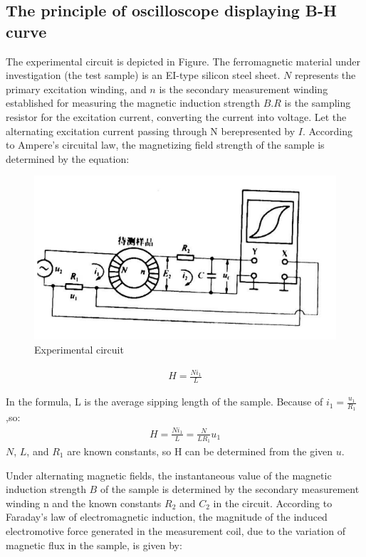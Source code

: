 \documentclass[UTF8]{article}
\begin{document}
    \subsection{The principle of oscilloscope displaying B-H curve}
    The experimental circuit is depicted in Figure. The ferromagnetic material under investigation (the test sample) is an EI-type silicon steel sheet. $N$ represents the primary excitation winding, and $n$ is the secondary measurement winding established for measuring the magnetic induction strength $B. R$ is the sampling resistor for the excitation current, converting the current into voltage. Let the alternating excitation current passing through N berepresented by $I$. According to Ampere's circuital law, the magnetizing field strength of the sample is determined by the equation:
       \begin{figure}[H]
       	    	\centering
       	    	\includegraphics[clip,scale=0.9,trim={0 0 0 0}]{fig/fig7.png}
       	        \caption{Experimental circuit}
       	        \label{figure.1}
           \end{figure}  
    
    \begin{eqnarray}
    H = \frac{Ni_1}{L}
    \end{eqnarray}
    
    In the formula, L is the average sipping length of the sample. Because of $i_1 = \frac{u_1}{R_1}$,so:
    \begin{eqnarray}
    H = \frac{Ni_1}{L} = \frac{N}{LR_1}u_1
    \end{eqnarray}
    $N$, $L$, and $R_1$ are known constants, so H can be determined from the given $u$.
    
    Under alternating magnetic fields, the instantaneous value of the magnetic induction strength $B$ of the sample is determined by the secondary measurement winding n and the known constants $R_2$ and $C_2$ in the circuit. According to Faraday's law of electromagnetic induction, the magnitude of the induced electromotive force generated in the measurement coil, due to the variation of magnetic flux in the sample, is given by:
    
\end{document}
